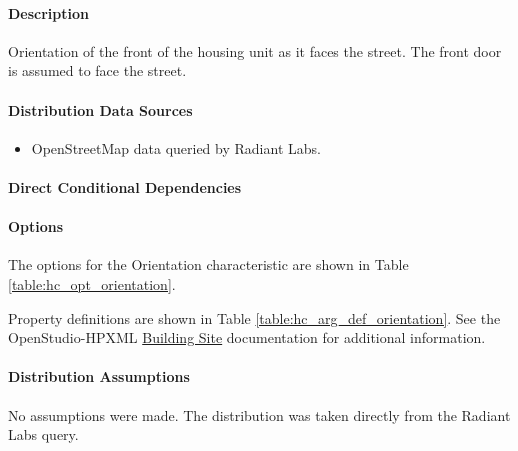 \paragraph{Description}
% 
Orientation of the front of the housing unit as it faces the street. The front door is assumed to face the street.

\paragraph{Distribution Data Sources}
% 
\begin{itemize}
    \item OpenStreetMap data queried by Radiant Labs.
\end{itemize}

\paragraph{Direct Conditional Dependencies}


\paragraph{Options}
The options for the Orientation characteristic are shown in Table \ref{table:hc_opt_orientation}.



Property definitions are shown in Table \ref{table:hc_arg_def_orientation}. See the OpenStudio-HPXML \href{https://openstudio-hpxml.readthedocs.io/en/v1.10.0/workflow_inputs.html#hpxml-building-site}{Building Site} documentation for additional information.



\paragraph{Distribution Assumptions}
% 
No assumptions were made. The distribution was taken directly from the Radiant Labs query.
